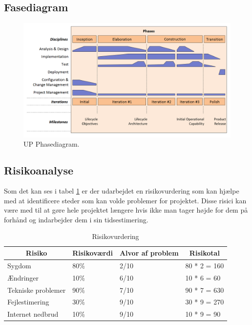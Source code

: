 \subsection{Fasediagram}

\begin{figure}
	\begin{center}
		\caption{UP Phasediagram.}
		\label{dia:upphase}
		\includegraphics[width=0.98\linewidth]{pictures/up/up-phase}
	\end{center}
\end{figure}

\subsection{Risikoanalyse}
Som det kan ses i tabel \ref{tbl:risikoanalyse} er der udarbejdet en risikovurdering som kan hjælpe med at identificere steder som kan volde problemer for projektet. Disse risici kan være med til at gøre hele projektet længere hvis ikke man tager højde for dem på forhånd og indarbejder dem i sin tidsestimering.

\begin{table}[]
	\centering
	\caption{Risikovurdering}
	\label{tbl:risikoanalyse}
	\begin{tabular}{|l|l|l|l|}
		\hline
		\multicolumn{1}{|c|}{\textbf{Risiko}} & \multicolumn{1}{c|}{\textbf{Risikoværdi}} & \multicolumn{1}{c|}{\textbf{Alvor af problem}} & \multicolumn{1}{c|}{\textbf{Risikotal}} \\ \hline
		Sygdom & 80\% & 2/10 & 80 * 2 = 160 \\ \hline
		Ændringer & 10\% & 6/10 & 10 * 6 = 60 \\ \hline
		Tekniske problemer & 90\% & 7/10 & 90 * 7 = 630 \\ \hline
		Fejlestimering & 30\% & 9/10 & 30 * 9 = 270 \\ \hline
		Internet nedbrud & 10\% & 9/10 & 10 * 9 = 90 \\ \hline
	\end{tabular}
\end{table}

